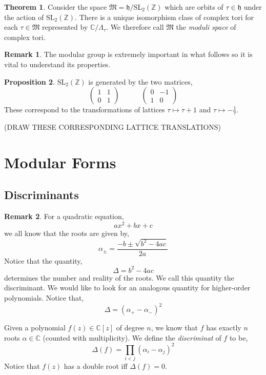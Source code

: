 \documentclass{article}
\newcommand{\SL}[0]{\mathrm{SL}}
\newcommand{\Z}{\mathbb{Z}}
\newcommand{\C}{\mathbb{C}}
\theoremstyle{definition}
\newtheorem{theorem}{Theorem}[section]
\newtheorem{proposition}[theorem]{Proposition}
\newtheorem{remark}{Remark}[section]
\newenvironment{definition}[1][Definition:]{\begin{trivlist}
\item[\hskip \labelsep {\bfseries #1}]}{\end{trivlist}}
\newcommand{\h}{\mathfrak{h}}
\newcommand{\MG}{\SL_2(\Z)}
\begin{document}
\begin{theorem}
Consider the space $\mathfrak{M} = \h / \MG$ which are orbits of $\tau \in \h$ under the action of $\MG$. There is a unique isomorphism class of complex tori for each $\tau \in \mathfrak{M}$ represented by $\C / \Lambda_\tau$. We therefore call $\mathfrak{M}$ the \textit{moduli space} of complex tori. 
\end{theorem}

\begin{remark}
The modular group is extremely important in what follows so it is vital to understand its properties. 
\end{remark}

\begin{proposition}
$\MG$ is generated by the two matrices,
\[ \begin{pmatrix}
1 & 1 
\\
0 & 1
\end{pmatrix}
\quad \quad \quad
\begin{pmatrix}
0 & -1 
\\
1 & 0
\end{pmatrix} \]
These correspond to the transformations of lattices $\tau \mapsto \tau + 1$ and $\tau \mapsto - \frac{1}{\tau}$. 
\end{proposition}  

{\color{red} (DRAW THESE CORRESPONDING LATTICE TRANSLATIONS) }


\section{Modular Forms}

\subsection{Discriminants}

\begin{remark}
For a quadratic equation, 
\[ a x^2 + b x + c \]
we all know that the roots are given by,
\[ \alpha_{\pm} = \frac{-b \pm \sqrt{b^2 - 4 ac}}{2 a} \]
Notice that the quantity,
\[ \Delta = b^2 - 4 ac \]
determines the number and reality of the roots. We call this quantity the discriminant. We would like to look for an analogous quantity for higher-order polynomials. Notice that,
\[ \Delta = (\alpha_{+} - \alpha_{-})^2 \]
\end{remark}

\begin{definition}
Given a polynomial $f(z) \in \C[z]$ of degree $n$, we know that $f$ has exactly $n$ roots $\alpha \in \C$ (counted with multiplicity). We define the \textit{discriminat} of $f$ to be,
\[ \Delta(f) = \prod_{i < j} (\alpha_i - \alpha_j)^2 \]
Notice that $f(z)$ has a double root iff $\Delta(f) = 0$.
\end{definition}
\end{document}
